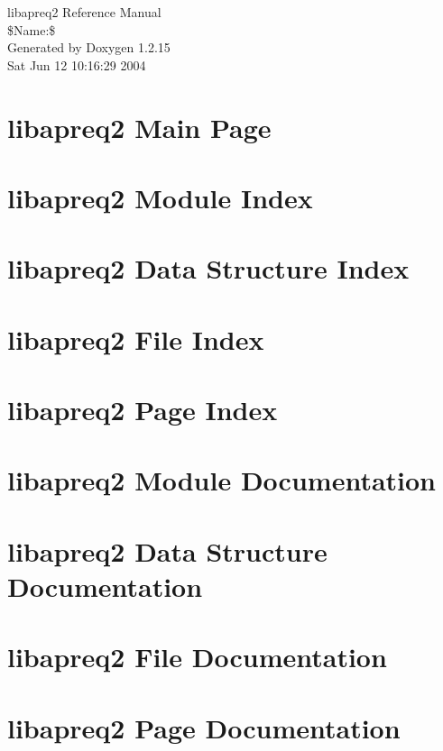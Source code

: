 \documentclass[a4paper]{book}
\begin{document}
\begin{titlepage}
\vspace*{7cm}
\begin{center}
{\Large libapreq2 Reference Manual\\[1ex]\large \$Name:\$}\\
\vspace*{1cm}
{\large Generated by Doxygen 1.2.15}\\
\vspace*{0.5cm}
{\small Sat Jun 12 10:16:29 2004}\\
\end{center}
\end{titlepage}
\clearemptydoublepage
{}
\tableofcontents
\clearemptydoublepage
{}
\chapter{libapreq2 Main Page}
\label{index}
\chapter{libapreq2 Module Index}

\chapter{libapreq2 Data Structure Index}

\chapter{libapreq2 File Index}

\chapter{libapreq2 Page Index}

\chapter{libapreq2 Module Documentation}
















\chapter{libapreq2 Data Structure Documentation}










\chapter{libapreq2 File Documentation}





\chapter{libapreq2 Page Documentation}




\printindex
\end{document}

